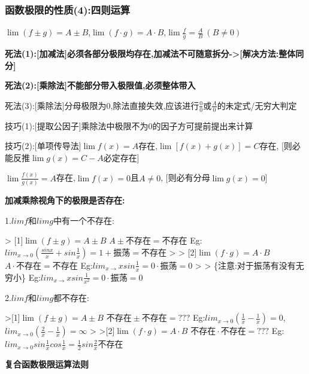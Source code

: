 \documentclass[11pt,a4paper,UTF8]{ctexart}
\begin{document}
\subsubsection{函数极限的性质(4):四则运算}

    $\lim(f \pm g) = A \pm B$,$\lim(f \cdot g) = A \cdot B$,$\lim\frac{f}{g} = \frac{A}{B}\ (B \ne 0)$

    \textbf{死法(1):[加减法]必须各部分极限均存在,加减法不可随意拆分->[解决方法:整体同分]}

    \textbf{死法(2):[乘除法]不能部分带入极限值,必须整体带入}

    \textit{}死法(3):[乘除法]分母极限为0,除法直接失效,应该进行$\frac{0}{0}$或$\frac{A}{0}$的未定式/无穷大判定\textit{}

    技巧(1):[提取公因子]乘除法中极限不为0的因子方可提前提出来计算

    技巧(2):[单项传导法]$\lim f(x) = A$存在,$\lim [f(x) + g(x)] = C$存在,	 [则必能反推$\lim g(x) = C - A$必定存在]

    		$\lim \frac{f(x)}{g(x)} = A$存在,$\lim f(x) = 0$且$A \neq 0$,    	[则必有分母$\lim g(x) = 0$]

    \textbf{加减乘除视角下的极限是否存在:}

    1.$limf$和$limg$中有一个不存在:

\begin{solbox}[{分步推导与答题规范}]
    >   [1]$\lim(f \pm g) = A \pm B$   $A\pm \text{不存在}=\text{不存在}$	Eg:$lim_{x\rightarrow 0}(\frac{sinx}{x}+sin\frac{1}{x})=1+\text{振荡}=\text{不存在}$
    >
    >   [2]$\lim(f \cdot g) = A \cdot B$	$A\cdot \text{不存在}=\text{不存在}$       Eg:$lim_{x\rightarrow}xsin\frac{1}{x}=0\cdot \text{振荡}=0$
    >
    >   \{注意:对于振荡有没有无穷小\}	               Eg:$lim_{x\rightarrow}xsin\frac{1}{x^2}=0\cdot \text{振荡}=0$
\end{solbox}

    2.$limf$和$limg$都不存在:

\begin{solbox}[{分步推导与答题规范}]
    >[1]$\lim(f \pm g) = A \pm B$   $\text{不存在}\pm \text{不存在}=???$       Eg:$lim_{x\rightarrow 0}(\frac{1}{x}-\frac{1}{x})=0$,$lim_{x\rightarrow 0}(\frac{2}{x}-\frac{1}{x})=\infty$
    >
    >[2]$\lim(f \cdot g) = A \cdot B$	$\text{不存在}\cdot \text{不存在}=???$	 Eg:$lim_{x\rightarrow 0}sin\frac{1}{x}cos\frac{1}{x}=\frac{1}{2}sin\frac{2}{x}\text{不存在}$
\end{solbox}

    \textbf{复合函数极限运算法则}
\end{document}
